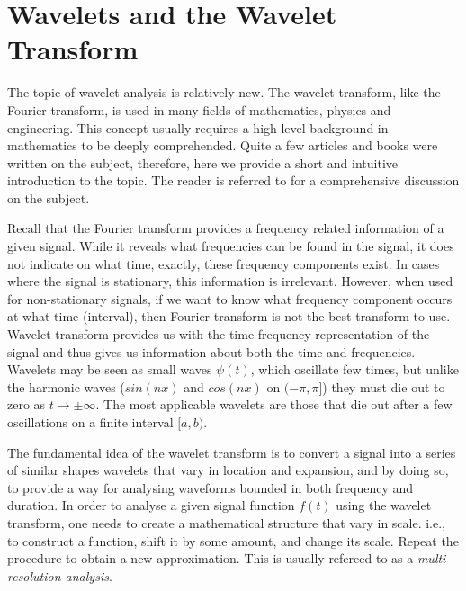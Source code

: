 %

\chapter{Wavelets and the Wavelet Transform}
\label{app:wavelets}

The topic of wavelet analysis is relatively new. The wavelet transform, like the Fourier transform, is used in many fields of mathematics, physics and engineering. 
This concept usually requires a high level background in mathematics to be deeply comprehended. 
Quite a few articles and books were written on the subject, therefore, here we provide a short and intuitive introduction to the topic. The reader is referred to \cite{meyer1992wavelets} for a comprehensive discussion on the subject.

Recall that the Fourier transform provides a frequency related information of a given signal. 
While it reveals what frequencies can be found in the signal, it does not indicate on what time, exactly, these frequency components exist. 
In cases where the signal is stationary, this information is irrelevant. 
However, when used for non-stationary signals, if we want to know what frequency component occurs at what time (interval), then Fourier transform is not the best transform to use. 
Wavelet transform provides us with the time-frequency representation of the signal and thus gives us information about both the time and frequencies.
Wavelets may be seen as small waves $\psi(t)$, which oscillate few times, but unlike the harmonic waves ($sin(nx)$ and $cos(nx)$ on $(-\pi,\pi]$) they must die out to zero as $t \rightarrow \pm\infty$. The most applicable wavelets are those that die out after a few oscillations on a finite interval $[a,b)$. 

The fundamental idea of the wavelet transform is to convert a signal into a series of similar shapes wavelets that vary in location and expansion, and by doing so, to provide a way for analysing waveforms bounded in both frequency and duration. 
In order to analyse a given signal function $f(t)$ using the wavelet transform, one needs to create a mathematical structure that vary in scale. i.e., to construct a function, shift it by some amount, and change its scale. Repeat the procedure to obtain a new approximation. This is usually refereed to as a \emph{multi-resolution analysis}.

